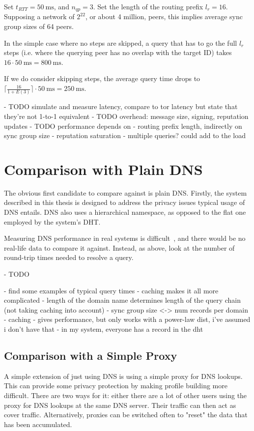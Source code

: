 Set $t_{RTT} = \SI{50}{\milli\second}$, and $n_{qp} = 3$. Set the length of the
routing prefix $l_r = 16$. Supposing a network of $2^{22}$, or about 4 million,
peers, this implies average sync group sizes of 64 peers.

In the simple case where no steps are skipped, a query that has to go the full
$l_r$ steps (i.e. where the querying peer has no overlap with the target ID)
takes $16 \cdot \SI{50}{\milli\second} = \SI{800}{\milli\second}$.

If we do consider skipping steps, the average query time drops to
$\lceil\frac{16}{1 + E(3)}\rceil \cdot \SI{50}{\milli\second} =
\SI{250}{\milli\second}$.

- TODO simulate and measure latency, compare to tor latency but state that
  they're not 1-to-1 equivalent
- TODO overhead: message size, signing, reputation updates
- TODO performance depends on
    - routing prefix length, indirectly on sync group size
    - reputation saturation
    - multiple queries? could add to the load

\section{Comparison with Plain DNS}
The obvious first candidate to compare against is plain DNS. Firstly, the system
described in this thesis is designed to address the privacy issues typical
usage of DNS entails. DNS also uses a hierarchical namespace, as opposed to the
flat one employed by the system's \ac{DHT}.

Measuring DNS performance in real systems is
difficult~\cite{liston2002diversity}, and there would be no real-life data to
compare it against. Instead, as above, look at the number of round-trip times
needed to resolve a query.

- TODO

- find some examples of typical query times
- caching makes it all more complicated
- length of the domain name determines length of the query chain (not taking
  caching into account)
- sync group size <-> num records per domain
- caching
    - gives performance, but only works with a power-law dist, i've assumed i
      don't have that
- in my system, everyone has a record in the dht

\subsection{Comparison with a Simple Proxy}
A simple extension of just using DNS is using a simple proxy for DNS lookups.
This can provide some privacy protection by making profile building more
difficult. There are two ways for it: either there are a lot of other users
using the proxy for DNS lookups at the same DNS server. Their traffic can then
act as cover traffic. Alternatively, proxies can be switched often to "reset"
the data that has been accumulated.


